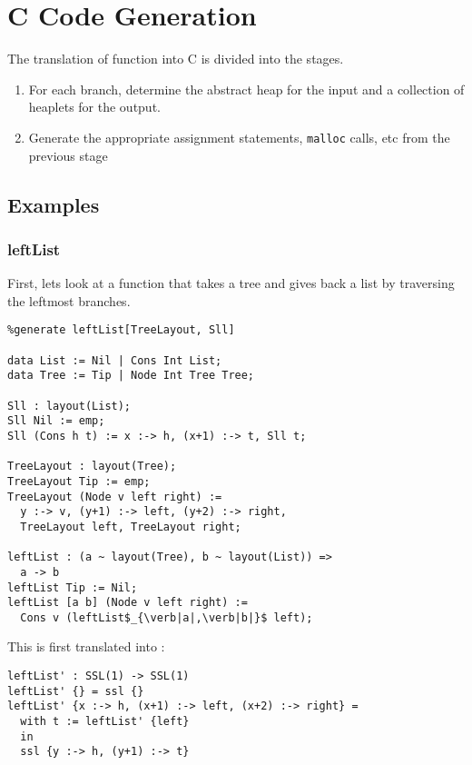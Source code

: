 \section{C Code Generation}

The translation of \PikaCore{} function into C is divided into the stages.

\begin{enumerate}
  \item \label{stage:in-out} For each branch, determine the abstract heap for the input and a collection of
    heaplets for the output.
  \item Generate the appropriate assignment statements, \verb|malloc| calls, etc from the
    previous stage
\end{enumerate}

\subsection{Examples}

\subsubsection{leftList}
First, lets look at a \Pika{} function that takes a tree and gives back a list by traversing the leftmost branches.

\begin{lstlisting}
%generate leftList[TreeLayout, Sll]

data List := Nil | Cons Int List;
data Tree := Tip | Node Int Tree Tree;

Sll : layout(List);
Sll Nil := emp;
Sll (Cons h t) := x :-> h, (x+1) :-> t, Sll t;

TreeLayout : layout(Tree);
TreeLayout Tip := emp;
TreeLayout (Node v left right) :=
  y :-> v, (y+1) :-> left, (y+2) :-> right,
  TreeLayout left, TreeLayout right;

leftList : (a ~ layout(Tree), b ~ layout(List)) =>
  a -> b
leftList Tip := Nil;
leftList [a b] (Node v left right) :=
  Cons v (leftList$_{\verb|a|,\verb|b|}$ left);
\end{lstlisting}

\noindent
This is first translated into \PikaCore:

\begin{lstlisting}
leftList' : SSL(1) -> SSL(1)
leftList' {} = ssl {}
leftList' {x :-> h, (x+1) :-> left, (x+2) :-> right} =
  with t := leftList' {left}
  in
  ssl {y :-> h, (y+1) :-> t}
\end{lstlisting}


